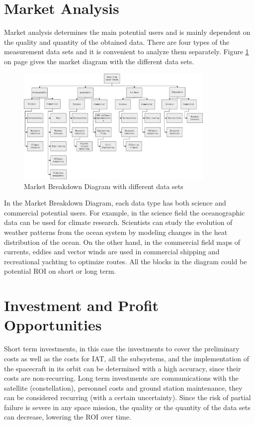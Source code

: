 \section{Market Analysis}
  \label{blMAanalysis}
Market analysis determines the main potential users and is mainly dependent on the quality and quantity of the obtained data. There are four types of the measurement data sets and it is convenient to analyze them separately. Figure \ref{MA} on page \pageref{MA} gives the market diagram with the different data sets.
\begin{figure} [h]
	\begin{center}
 \includegraphics[width=0.85\textwidth,angle=0]{chapters/img/Market_analysis.jpg}	
	\caption{Market Breakdown Diagram with different data sets\cite{Market}}
	\label{MA}
	\end{center}
\end{figure}
In the Market Breakdown Diagram, each data type has both science and commercial potential users. For example, in the science field the oceanographic data can be used for climate research. Scientists can study the evolution of weather patterns from the ocean system by modeling changes in the heat distribution of the ocean. On the other hand, in the commercial field maps of currents, eddies and vector winds are used in commercial shipping and recreational yachting to optimize routes. All the blocks in the diagram could be potential \acs{ROI} on short or long term.

\section{Investment and Profit Opportunities}
	\label{blMAipo}
Short term investments, in this case the investments to cover the preliminary costs as well as the costs for \ac{IAT}, all the subsystems, and the implementation of the spacecraft in its orbit can be determined with a high accuracy, since their costs are non-recurring. Long term investments are communications with the satellite (constellation), personnel costs and ground station maintenance, they can be considered recurring (with a certain uncertainty). Since the risk of partial failure is severe in any space mission, the quality or the quantity of the data sets can decrease, lowering the \acs{ROI} over time. 

